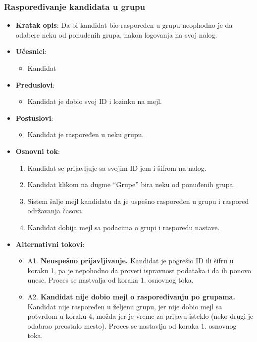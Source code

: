 \subsubsection{Raspoređivanje kandidata u grupu}
\label{subsubsec:grupe}
\begin{itemize}
  \item \textbf{Kratak opis}: Da bi kandidat bio raspoređen u grupu neophodno je da odabere neku od ponuđenih grupa, nakon logovanja na svoj nalog. 
  \item \textbf{Učesnici}: 
    \begin{itemize}
    \item  Kandidat
    \end{itemize}
  \item \textbf{Preduslovi}:
    \begin{itemize}
    \item Kandidat je dobio svoj ID i lozinku na mejl.
    \end{itemize}
  \item \textbf{Postuslovi}:
      \begin{itemize}
      \item Kandidat je raspoređen u neku grupu.
      \end{itemize}
  \item \textbf{Osnovni tok}:
      \begin{enumerate}
        \item Kandidat se prijavljuje sa svojim ID-jem i šifrom na nalog.
        \item Kandidat klikom na dugme “Grupe” bira neku od ponuđenih grupa.
        \item Sistem šalje mejl kandidatu da je uspešno raspoređen u grupu i raspored održavanja časova.
        \item Kandidat dobija mejl sa podacima o grupi i rasporedu nastave.
      \end{enumerate}

  \item \textbf{Alternativni tokovi}:
      \begin{itemize}
        \item A1. \textbf{Neuspešno prijavljivanje.}
        Kandidat je pogrešio ID ili šifru u koraku 1, pa je nepohodno da proveri ispravnost podataka i da ih ponovo unese. Proces se nastvalja od koraka 1. osnovnog toka.
        \item A2. \textbf{Kandidat nije dobio mejl o raspoređivanju po grupama.}
        Kandidat nije raspoređen u željenu grupu, jer nije dobio mejl sa potvrdom u koraku 4, možda jer je vreme za prijavu isteklo (neko drugi je odabrao preostalo mesto). Proces se nastavlja od koraka 1. osnovnog toka.
      \end{itemize}
\end{itemize}

